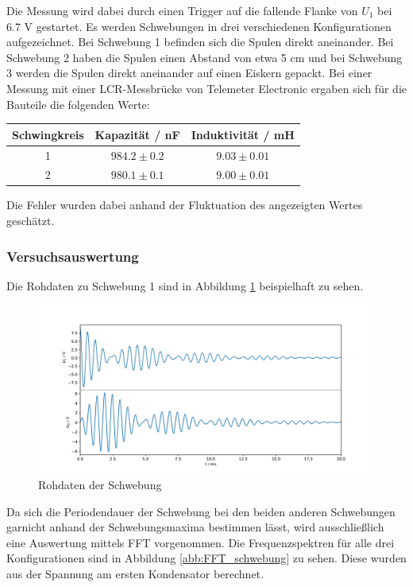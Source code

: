 Die Messung wird dabei durch einen Trigger auf die fallende Flanke von $U_1$ bei 6.7 V gestartet. Es werden Schwebungen in drei verschiedenen Konfigurationen aufgezeichnet. Bei Schwebung 1 befinden sich die Spulen direkt aneinander. Bei Schwebung 2 haben die Spulen einen Abstand von etwa 5 cm und bei Schwebung 3 werden die Spulen direkt aneinander auf einen Eiskern gepackt. Bei einer Messung mit einer LCR-Messbrücke von Telemeter Electronic ergaben sich für die Bauteile die folgenden Werte:

\begin{table}[H]
\centering
\begin{tabular}{c|c|c}
Schwingkreis & Kapazität / nF & Induktivität / mH\\
\hline
1 & $984.2 \pm 0.2$ & $9.03 \pm 0.01$ \\
2 & $980.1 \pm 0.1$ & $9.00 \pm 0.01$
\end{tabular}
\end{table} 

Die Fehler wurden dabei anhand der Fluktuation des angezeigten Wertes geschätzt.

\subsubsection{Versuchsauswertung}

Die Rohdaten zu Schwebung 1 sind in Abbildung \ref{abb:schwebung_roh} beispielhaft zu sehen.

\begin{figure}[H]
\centering
\includegraphics[width=\textwidth]{plots/schwebung_roh.pdf}
\caption{Rohdaten der Schwebung}
\label{abb:schwebung_roh}
\end{figure}

Da sich die Periodendauer der Schwebung bei den beiden anderen Schwebungen garnicht anhand der Schwebungsmaxima bestimmen lässt, wird ausschließlich eine Auswertung mittels FFT vorgenommen. Die Frequenzspektren für alle drei Konfigurationen sind in Abbildung \ref{abb:FFT_schwebung} zu sehen. Diese wurden aus der Spannung am ersten Kondensator berechnet.

